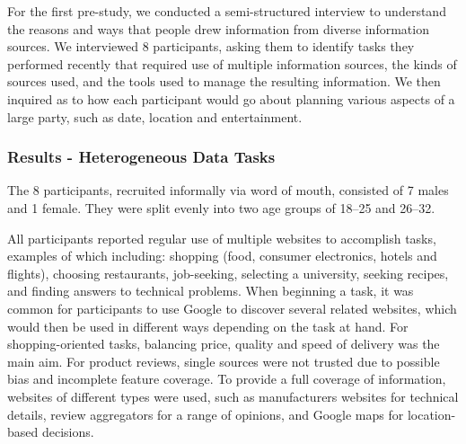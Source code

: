 \documentclass{sigchi}
\begin{document}
For the first pre-study, we conducted a semi-structured interview to understand the reasons and ways that people drew information from diverse information sources. We interviewed 8 participants, asking them to identify tasks they performed recently that required use of multiple information sources, the kinds of sources used, and the tools used to manage the resulting information.  We then inquired as to how each participant would go about planning various aspects of a large party, such as date, location and entertainment.

\subsubsection{Results - Heterogeneous Data Tasks}

The 8 participants, recruited informally via word of mouth, consisted of 7 males and 1 female. They were split evenly into two age groups of 18--25 and 26--32.   

All participants reported regular use of multiple websites to accomplish tasks, examples of which including: shopping (food, consumer electronics, hotels and flights), choosing restaurants, job-seeking, selecting a university, seeking recipes, and finding answers to technical problems.  When beginning a task, it was common for participants to use Google to discover several related websites, which would then be used in different ways depending on the task at hand. For shopping-oriented tasks, balancing price, quality and speed of delivery was the main aim.  For product reviews, single sources were not trusted due to possible bias and incomplete feature coverage.  
To provide a full coverage of information, websites of different types were used, such as manufacturers websites for technical details, review aggregators for a range of opinions, and Google maps for location-based decisions.
\end{document}
